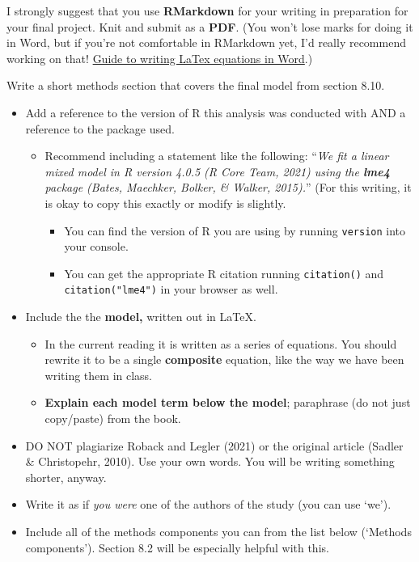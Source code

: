 \documentclass[
  openany]{book}
\begin{document}
I strongly suggest that you use \textbf{RMarkdown} for your writing in preparation for your final project. Knit and submit as a \textbf{PDF}. (You won't lose marks for doing it in Word, but if you're not comfortable in RMarkdown yet, I'd really recommend working on that! \href{https://support.microsoft.com/en-us/office/linear-format-equations-using-unicodemath-and-latex-in-word-2e00618d-b1fd-49d8-8cb4-8d17f25754f8}{Guide to writing LaTex equations in Word}.)

Write a short methods section that covers the final model from section 8.10.

\begin{itemize}
\item
  Add a reference to the version of R this analysis was conducted with AND a reference to the package used.

  \begin{itemize}
  \item
    Recommend including a statement like the following: ``\emph{We fit a linear mixed model in R version 4.0.5 (R Core Team, 2021) using the \textbf{lme4} package (Bates, Maechker, Bolker, \& Walker, 2015).}'' (For this writing, it is okay to copy this exactly or modify is slightly.

    \begin{itemize}
    \item
      You can find the version of R you are using by running \texttt{version} into your console.
    \item
      You can get the appropriate R citation running \texttt{citation()} and \texttt{citation("lme4")} in your browser as well.
    \end{itemize}
  \end{itemize}
\item
  Include the the \textbf{model,} written out in LaTeX.

  \begin{itemize}
  \item
    In the current reading it is written as a series of equations. You should rewrite it to be a single \textbf{composite} equation, like the way we have been writing them in class.
  \item
    \textbf{Explain each model term below the model}; paraphrase (do not just copy/paste) from the book.
  \end{itemize}
\item
  DO NOT plagiarize Roback and Legler (2021) or the original article (Sadler \& Christopehr, 2010). Use your own words. You will be writing something shorter, anyway.
\item
  Write it as if \emph{you were} one of the authors of the study (you can use `we').
\item
  Include all of the methods components you can from the list below (`Methods components'). Section 8.2 will be especially helpful with this.


\end{itemize}
\end{document}
